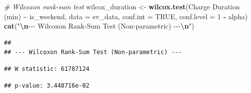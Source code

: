 \documentclass[
  12pt,
]{article}
\newenvironment{Shaded}{\begin{snugshade}}{\end{snugshade}}
\newcommand{\AttributeTok}[1]{\textcolor[rgb]{0.13,0.29,0.53}{#1}}
\newcommand{\CommentTok}[1]{\textcolor[rgb]{0.56,0.35,0.01}{\textit{#1}}}
\newcommand{\ConstantTok}[1]{\textcolor[rgb]{0.56,0.35,0.01}{#1}}
\newcommand{\DecValTok}[1]{\textcolor[rgb]{0.00,0.00,0.81}{#1}}
\newcommand{\FunctionTok}[1]{\textcolor[rgb]{0.13,0.29,0.53}{\textbf{#1}}}
\newcommand{\NormalTok}[1]{#1}
\newcommand{\OtherTok}[1]{\textcolor[rgb]{0.56,0.35,0.01}{#1}}
\newcommand{\SpecialCharTok}[1]{\textcolor[rgb]{0.81,0.36,0.00}{\textbf{#1}}}
\newcommand{\StringTok}[1]{\textcolor[rgb]{0.31,0.60,0.02}{#1}}
\begin{document}
\begin{Shaded}
\begin{Highlighting}[]
\CommentTok{\# Wilcoxon rank{-}sum test}
\NormalTok{wilcox\_duration }\OtherTok{\textless{}{-}} \FunctionTok{wilcox.test}\NormalTok{(}\StringTok{\textasciigrave{}}\AttributeTok{Charge Duration (min)}\StringTok{\textasciigrave{}} \SpecialCharTok{\textasciitilde{}}\NormalTok{ is\_weekend,}
    \AttributeTok{data =}\NormalTok{ ev\_data, }\AttributeTok{conf.int =} \ConstantTok{TRUE}\NormalTok{, }\AttributeTok{conf.level =} \DecValTok{1} \SpecialCharTok{{-}}\NormalTok{ alpha)}
\FunctionTok{cat}\NormalTok{(}\StringTok{"}\SpecialCharTok{\textbackslash{}n}\StringTok{{-}{-}{-} Wilcoxon Rank{-}Sum Test (Non{-}parametric) {-}{-}{-}}\SpecialCharTok{\textbackslash{}n}\StringTok{"}\NormalTok{)}
\end{Highlighting}
\end{Shaded}

\begin{verbatim}
## 
## --- Wilcoxon Rank-Sum Test (Non-parametric) ---
\end{verbatim}

\begin{Shaded}
\end{Shaded}

\begin{verbatim}
## W statistic: 61787124
\end{verbatim}

\begin{Shaded}
\end{Shaded}

\begin{verbatim}
## p-value: 3.448716e-02
\end{verbatim}

\begin{Shaded}
\end{Shaded}
\end{document}
